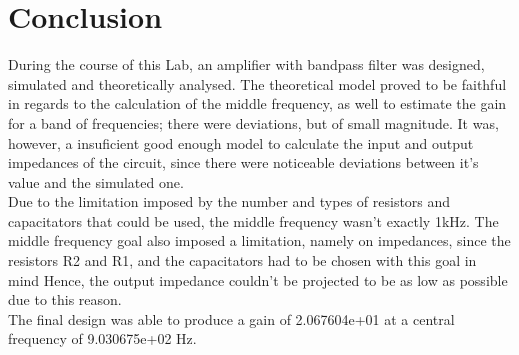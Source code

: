 \section{Conclusion}
\label{sec:conclusion} 
During the course of this Lab, an amplifier with bandpass filter was designed, simulated and theoretically analysed. The theoretical model proved to be faithful in regards to the calculation of the middle frequency, as well to estimate the gain for a band of frequencies; there were deviations, but of small magnitude. It was, however, a insuficient good enough model to calculate the input and output impedances of the circuit, since there were noticeable deviations between it's value and  the simulated one.\\
Due to the limitation imposed by the number and types of resistors and capacitators that could be used, the middle frequency wasn't exactly 1kHz. The middle frequency goal also imposed a limitation, namely on impedances, since the resistors R2 and R1, and the capacitators had to be chosen with this goal in mind Hence, the output impedance couldn't be projected to be as low as possible due to this reason.\\
The final design was able to produce a gain of 2.067604e+01 at a central frequency of 9.030675e+02 Hz.\\
